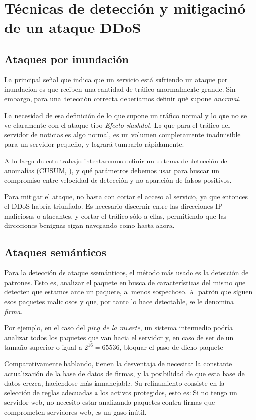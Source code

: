 \section{Técnicas de detección y mitigacinó de un ataque DDoS}
\subsection{Ataques por inundación}
La principal señal que indica que un servicio está sufriendo un ataque por inundación es que reciben una cantidad de 
tráfico anormalmente grande. Sin embargo, para una detección correcta deberíamos definir qué supone \emph{anormal}. 

La necesidad de esa definición de lo que supone un tráfico normal y lo que no se ve claramente con el ataque tipo 
\emph{Efecto slashdot}. Lo que para el tráfico del servidor de noticias es algo normal, es un volumen completamente 
inadmisible para un servidor pequeño, y logrará tumbarlo rápidamente.

A lo largo de este trabajo intentaremos definir un sistema de detección de anomalías (CUSUM, ), y 
qué parámetros debemos usar para buscar un compromiso entre velocidad de detección y no aparición de falsos positivos.

Para mitigar el ataque, no basta con cortar el acceso al servicio, ya que entonces el \gls{DDoS} habría triunfado. Es 
necesario discernir entre las direcciones IP maliciosas o atacantes, y cortar el tráfico sólo a ellas, permitiendo que 
las direcciones benignas sigan navegando como hasta ahora.

\subsection{Ataques semánticos}
Para la detección de ataque ssemánticos, el método más usado es la detección de patrones. Esto es, analizar el paquete 
en busca de características del mismo que detecten que estamos ante un paquete, al menos sospechoso. Al patrón que 
siguen esos paquetes maliciosos y que, por tanto lo hace detectable, se le denomina \emph{firma}.

Por ejemplo, en el caso del \emph{ping de la muerte}, un sistema intermedio podría analizar todos los paquetes que van 
hacia el servidor y, en caso de ser de un tamaño superior o igual a $2^16=65536$, bloquar el paso de dicho paquete.

Comparativamente hablando, tienen la desventaja de necesitar la constante actualización de la base de datos de firmas, 
y la posibilidad de que esta base de datos crezca, haciendose más inmanejable. Su refinamiento consiste en la selección 
de reglas adecuadas a los activos protegidos, esto es: Si no tengo un servidor web, no necesito estar analizando 
paquetes contra firmas que comprometen servidores web, es un gaso inútil.

